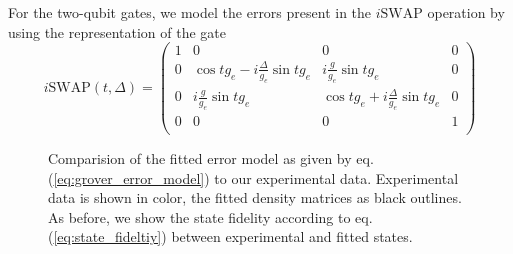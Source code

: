 For the two-qubit gates, we model the errors present in the $i\mathrm{SWAP}$ operation by using the representation of the gate
%
\begin{equation}
i\mathrm{SWAP}(t,\Delta) = \left(
			\begin{array}{cccc}
				1 & 0 & 0 & 0 \\
				0 & \cos{t g_{e}}-i\frac{\Delta}{g_{e}}\sin{t g_{e}} & i \frac{g}{g_e}\sin{t g_{e}} & 0 \\
				0 & i\frac{g}{g_e}\sin{t g_{e}} & \cos{t g_{e}}+i\frac{\Delta}{g_{e}}\sin{t g_{e}} & 0 \\
				0 & 0 & 0 & 1 \\
			\end{array}
	\right) \label{eq:swap_with_detuning}
\end{equation}
%
\begin{figure}
	\centering
	\caption[Comparision of the general error model to our experimental data]{Comparision of the fitted error model as given by eq. (\ref{eq:grover_error_model}) to our experimental data. Experimental data is shown in color, the fitted density matrices as black outlines. As before, we show the state fidelity according to eq. (\ref{eq:state_fideltiy}) between experimental and fitted states.}
	\label{fig:grover_error_model}
\end{figure}

